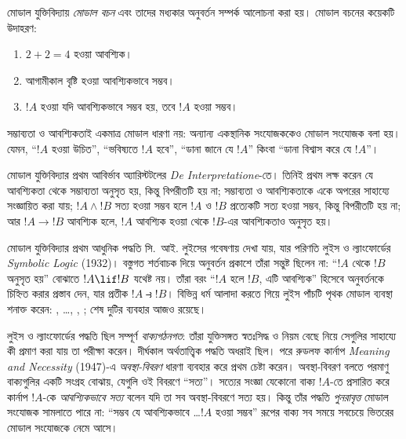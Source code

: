 \documentclass[../../../include/open-logic-section]{subfiles}
\begin{document}


মোডাল যুক্তিবিদ্যায় \emph{মোডাল বচন} এবং তাদের মধ্যকার অনুবর্তন সম্পর্ক
আলোচনা করা হয়। মোডাল বচনের কয়েকটি উদাহরণ:
\begin{enumerate}
\item $2+2=4$ হওয়া আবশ্যিক।
\item আগামীকাল বৃষ্টি হওয়া আবশ্যিকভাবে সম্ভব।
\item $!A$ হওয়া যদি আবশ্যিকভাবে সম্ভব হয়, তবে $!A$ হওয়া সম্ভব।
\end{enumerate}
সম্ভাব্যতা ও আবশ্যিকতাই একমাত্র মোডাল ধারণা নয়: অন্যান্য একস্থানিক সংযোজককেও
মোডাল সংযোজক বলা হয়। যেমন, ``$!A$ হওয়া উচিত'', ``ভবিষ্যতে $!A$ হবে'',
``ডানা জানে যে $!A$'' কিংবা ``ডানা বিশ্বাস করে যে $!A$''।

মোডাল যুক্তিবিদ্যার প্রথম আবির্ভাব অ্যারিস্টটলের \emph{De
  Interpretatione}-তে। তিনিই প্রথম লক্ষ করেন যে আবশ্যিকতা থেকে
সম্ভাব্যতা অনুসৃত হয়, কিন্তু বিপরীতটি হয় না; সম্ভাব্যতা ও আবশ্যিকতাকে
একে অপরের সাহায্যে সংজ্ঞায়িত করা যায়; $!A \land !B$ সত্য হওয়া সম্ভব হলে
$!A$ ও $!B$ প্রত্যেকটি সত্য হওয়া সম্ভব, কিন্তু বিপরীতটি হয় না; আর
$!A \to !B$ আবশ্যিক হলে, $!A$ আবশ্যিক হওয়া থেকে $!B$-এর
আবশ্যিকতাও অনুসৃত হয়।

মোডাল যুক্তিবিদ্যার প্রথম আধুনিক পদ্ধতি সি.~আই. লুইসের গবেষণায় দেখা যায়,
যার পরিণতি লুইস ও ল্যাংফোর্ডের \emph{Symbolic Logic} (1932)।
বস্তুগত শর্তবাচক দিয়ে অনুবর্তন প্রকাশে তাঁরা সন্তুষ্ট ছিলেন না:
``$!A$ থেকে $!B$ অনুসৃত হয়'' বোঝাতে $!A \lif !B$ যথেষ্ট নয়।
তাঁরা বরং ``$!A$ হলে $!B$, এটি আবশ্যিক'' হিসেবে অনুবর্তনকে
চিহ্নিত করার প্রস্তাব দেন, যার প্রতীক $!A \strictif !B$। বিভিন্ন
ধর্ম আলাদা করতে গিয়ে লুইস পাঁচটি পৃথক মোডাল ব্যবস্থা শনাক্ত করেন:
, \ldots, , ; শেষ দুটির ব্যবহার আজও রয়েছে।

লুইস ও ল্যাংফোর্ডের পদ্ধতি ছিল সম্পূর্ণ \emph{বাক্যগঠনগত}: তাঁরা
যুক্তিসঙ্গত স্বতঃসিদ্ধ ও নিয়ম বেছে নিয়ে সেগুলির সাহায্যে কী প্রমাণ করা
যায় তা পরীক্ষা করেন। দীর্ঘকাল অর্থতাত্ত্বিক পদ্ধতি অধরাই ছিল। পরে
রুডলফ কার্নাপ \emph{Meaning and Necessity} (1947)-এ \emph{অবস্থা-বিবরণ}
ধারণা ব্যবহার করে প্রথম চেষ্টা করেন। অবস্থা-বিবরণ বলতে পরমাণু বাক্যগুলির
একটি সংগ্রহ বোঝায়, যেগুলি ওই বিবরণে ``সত্য''। সত্যের সংজ্ঞা যেকোনো
বাক্য $!A$-তে প্রসারিত করে কার্নাপ $!A$-কে \emph{আবশ্যিকভাবে সত্য}
বলেন যদি তা সব অবস্থা-বিবরণে সত্য হয়। কিন্তু তাঁর পদ্ধতি \emph{পুনরাবৃত্ত}
মোডাল সংযোজক সামলাতে পারে না: ``সম্ভব যে আবশ্যিকভাবে \ldots $!A$ হওয়া সম্ভব''
রূপের বাক্য সব সময়ে সবচেয়ে ভিতরের মোডাল সংযোজকে নেমে আসে।
\end{document}
